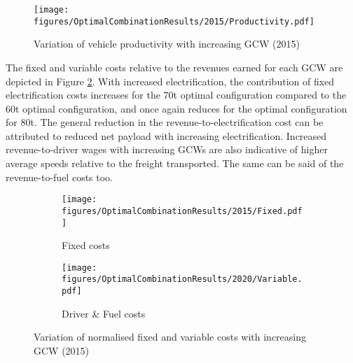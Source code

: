 \documentclass[ExampleMasters.tex]{subfiles}
\begin{document}
	\begin{figure}[H]
		\centering
		\texttt{[image: figures/OptimalCombinationResults/2015/Productivity.pdf]}
		\caption{Variation of vehicle productivity with increasing GCW (2015)}
		\label{prodVaryGCW2015}
	\end{figure}

	The fixed and variable costs relative to the revenues earned for each GCW are depicted in Figure \ref{fixedVariableCostVaryGCW2015}. With increased electrification, the contribution of fixed electrification costs increases for the 70t optimal configuration compared to the 60t optimal configuration, and once again reduces for the optimal configuration for 80t. The general reduction in the revenue-to-electrification cost can be attributed to reduced net payload with increasing electrification. Increased revenue-to-driver wages with increasing GCWs are also indicative of higher average speeds relative to the freight transported. The same can be said of the revenue-to-fuel costs too.\\ 

	\begin{figure}[H]
		\begin{subfigure}{.5\textwidth}
			\centering
			\texttt{[image: figures/OptimalCombinationResults/2015/Fixed.pdf]}
			\caption{Fixed costs}
		\end{subfigure}
		\begin{subfigure}{.5\textwidth}
			\centering
			\texttt{[image: figures/OptimalCombinationResults/2020/Variable.pdf]}
			\caption{Driver \& Fuel costs}
		\end{subfigure}
		\caption{Variation of normalised fixed and variable costs with increasing GCW (2015)}
		\label{fixedVariableCostVaryGCW2015}
	\end{figure}

	\newpage

\end{document}
